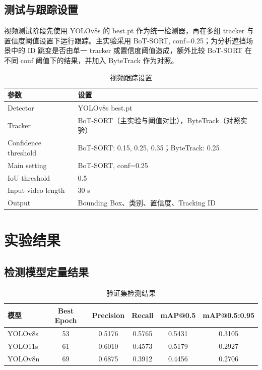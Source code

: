 \documentclass[UTF8,a4paper,12pt]{ctexart}
\begin{document}
\subsection{测试与跟踪设置}

视频测试阶段先使用 YOLOv8s 的 best.pt 作为统一检测器，再在多组 tracker 与置信度阈值设置下运行跟踪。主实验采用 BoT-SORT, conf=0.25；为分析遮挡场景中的 ID 跳变是否由单一 tracker 或置信度阈值造成，额外比较 BoT-SORT 在不同 conf 阈值下的结果，并加入 ByteTrack 作为对照。
\begin{table}[H]
    \centering
    \caption{视频跟踪设置}
    \begin{tabular}{lp{9cm}}
        \toprule
        参数 & 设置 \\
        \midrule
        Detector & YOLOv8s best.pt \\
        Tracker & BoT-SORT（主实验与阈值对比），ByteTrack（对照实验） \\
        Confidence threshold & BoT-SORT: 0.15, 0.25, 0.35；ByteTrack: 0.25 \\
        Main setting & BoT-SORT, conf=0.25 \\
        IoU threshold & 0.5 \\
        Input video length & 30 s \\
        Output & Bounding Box、类别、置信度、Tracking ID \\
        \bottomrule
    \end{tabular}
\end{table}

\section{实验结果}

\subsection{检测模型定量结果}

\begin{table}[H]
    \centering
    \caption{验证集检测结果}
    \begin{tabular}{lccccc}
        \toprule
        模型 & Best Epoch & Precision & Recall & mAP@0.5 & mAP@0.5:0.95 \\
        \midrule
        YOLOv8s & 53 & 0.5176 & 0.5765 & 0.5431 & 0.3105 \\
        YOLO11s & 61 & 0.6010 & 0.4573 & 0.5179 & 0.2927 \\
        YOLOv8n & 69 & 0.6875 & 0.3912 & 0.4456 & 0.2706 \\
        \bottomrule
    \end{tabular}
\end{table}
\end{document}
